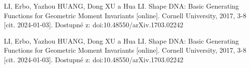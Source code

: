 \begin{thebibliography}{99}
		LI, Erbo, Yazhou HUANG, Dong XU a Hua LI. Shape DNA: Basic Generating Functions for Geometric Moment Invariants [online]. Cornell University, 2017, 3-8 [cit. 2024-01-03]. Dostupné z: doi:10.48550/arXiv.1703.02242

		LI, Erbo, Yazhou HUANG, Dong XU a Hua LI. Shape DNA: Basic Generating Functions for Geometric Moment Invariants [online]. Cornell University, 2017, 3-8 [cit. 2024-01-03]. Dostupné z: doi:10.48550/arXiv.1703.02242
%  
%  
%  
%  
%  
%  
%  
%  
%  
\end{thebibliography}


